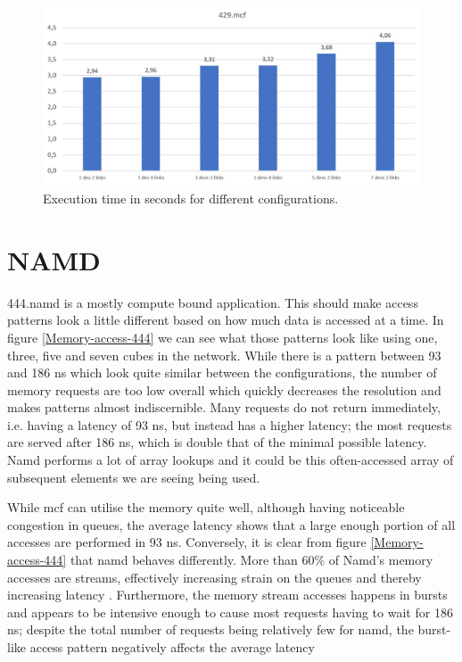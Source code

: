 \begin{figure}[!ht]
    \centering
    \includegraphics[width=1.0\linewidth]{figure/429-exectime.jpg}
    \caption{Execution time in seconds for different configurations.}
    \label{Memory-access-429-exectime}
\end{figure}

\section{NAMD}
444.namd is a mostly compute bound application. This should make access patterns look a little different based on how much data is accessed at a time. In figure \ref{Memory-access-444} we can see what those patterns look like using one, three, five and seven cubes in the network. While there is a pattern between 93 and 186 ns which look quite similar between the configurations, the number of memory requests are too low overall which quickly decreases the resolution and makes patterns almost indiscernible. Many requests do not return immediately, i.e. having a latency of 93 ns, but instead has a higher latency; the most requests are served after 186 ns, which is double that of the minimal possible latency. Namd performs a lot of array lookups and it could be this often-accessed array of subsequent elements we are seeing being used. %
\bigskip

While mcf can utilise the memory quite well, although having noticeable congestion in queues, the average latency shows that a large enough portion of all accesses are performed in 93 ns. Conversely, it is clear from figure \ref{Memory-access-444} that namd behaves differently. More than 60\% of Namd's memory accesses are streams, effectively increasing strain on the queues and thereby increasing latency \cite{10.1145/3307650.3322229}. Furthermore, the memory stream accesses happens in bursts and appears to be intensive enough to cause most requests having to wait for 186 ns; despite the total number of requests being relatively few for namd, the burst-like access pattern negatively affects the average latency
\bigskip


